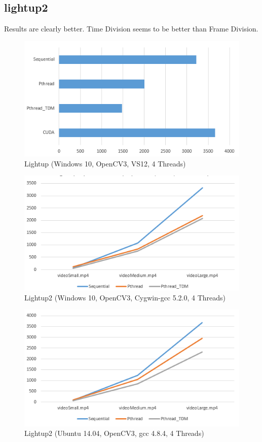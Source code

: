 \documentclass{acm_proc_article-sp}
\begin{document}
\subsection{lightup2}
Results are clearly better. Time Division seems to be better than Frame Division.
\begin{figure}[H]
  \includegraphics[width=\linewidth,natwidth=677,natheight=407]{lightup2.png}
  \caption{Lightup (Windows 10, OpenCV3, VS12, 4 Threads)}
  \label{fig:lightup2}
\end{figure}
\begin{figure}[H]
  \includegraphics[width=\linewidth,natwidth=535,natheight=285]{lightup2_sml.png}
  \caption{Lightup2 (Windows 10, OpenCV3, Cygwin-gcc 5.2.0, 4 Threads)}
  \label{fig:lightup2_sml}
\end{figure}
\begin{figure}[H]
  \includegraphics[width=\linewidth,natwidth=536,natheight=290]{lightup2_ubuntu.png}
  \caption{Lightup2 (Ubuntu 14.04, OpenCV3, gcc 4.8.4, 4 Threads)}
  \label{fig:lightup2_ubuntu}
\end{figure}
\end{document}
